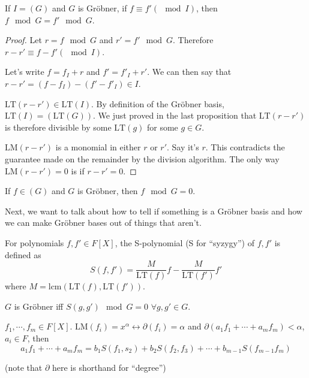 \documentclass[a4paper,twoside,master.tex]{subfiles}
\begin{document}
\begin{claim}
    If $ I = (G) $ and $ G $ is Gr\"obner, if $ f \equiv f' (\mod I) $, then $ f\mod G = f'\mod G $.
\end{claim}

\begin{proof}
    Let $ r = f\mod G $ and $ r' = f'\mod G $. Therefore $ r - r' \equiv f-f' (\mod I) $.

    Let's write $ f = f_I + r $ and $ f' = f'_I + r' $. We can then say that $ r - r' = (f-f_I)- (f' - f'_I) \in I $.

    $ \text{LT}(r-r') \in \text{LT}(I) $. By definition of the Gr\"obner basis, $ \text{LT}(I) = (\text{LT}(G)) $. We just proved in the last proposition that $ \text{LT}(r-r') $ is therefore divisible by some $ \text{LT}(g) $ for some $ g \in G $.

    $ \text{LM}(r-r') $ is a monomial in either $ r $ or $ r' $. Say it's $ r $. This contradicts the guarantee made on the remainder by the division algorithm. The only way $ \text{LM}(r-r') = 0 $ is if $ r-r' = 0 $. 
\end{proof}
\begin{corollary}
    If $ f \in (G) $ and $ G $ is Gr\"obner, then $ f\mod G = 0 $.
\end{corollary}


Next, we want to talk about how to tell if something is a Gr\"obner basis and how we can make Gr\"obner bases out of things that aren't.

\begin{definition}
    For polynomials $ f,f' \in F[X] $, the S-polynomial (S for ``syzygy'') of $ f, f' $ is defined as
    \begin{equation}
        S(f,f') = \frac{M}{\text{LT}(f)} f - \frac{M}{\text{LT}(f')} f'
    \end{equation}
    where $ M = \text{lcm}(\text{LT}(f), \text{LT}(f')) $.
\end{definition}

\begin{theorem}
    $ G $ is Gr\"obner iff $ S(g,g') \mod G = 0 $ $ \forall g, g' \in G $.  
\end{theorem}

\begin{lemma}
    $ f_1, \cdots, f_m \in F[X] $. $ \text{LM}(f_i)= x^{\alpha} \leftrightarrow \partial(f_i) = \alpha $ and $ \partial(a_1 f_1 + \cdots + a_m f_m) < \alpha $, $ a_i \in F $, then
    \begin{equation}
        a_1 f_1 + \cdots + a_m f_m = b_1 S(f_1, s_2) + b_2 S(f_2, f_3) + \cdots + b_{m-1} S(f_{m - 1} f_{m})
    \end{equation}
    
    (note that $ \partial $ here is shorthand for ``degree'')
\end{lemma}
\end{document}
